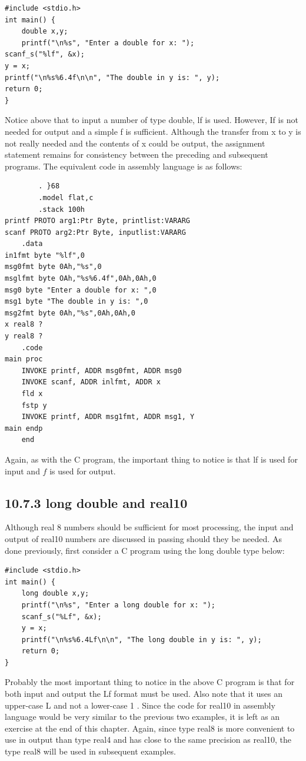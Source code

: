 \documentclass[10pt]{article}
\begin{document}
\begin{verbatim}
#include <stdio.h>
int main() {
    double x,y;
    printf("\n%s", "Enter a double for x: ");
scanf_s("%lf", &x);
y = x;
printf("\n%s%6.4f\n\n", "The double in y is: ", y);
return 0;
}
\end{verbatim}

Notice above that to input a number of type double, lf is used. However, If is not needed for output and a simple f is sufficient. Although the transfer from x to y is not really needed and the contents of x could be output, the assignment statement remains for consistency between the preceding and subsequent programs. The equivalent code in assembly language is as follows:

\begin{verbatim}
        . }68
        .model flat,c
        .stack 100h
printf PROTO arg1:Ptr Byte, printlist:VARARG
scanf PROTO arg2:Ptr Byte, inputlist:VARARG
    .data
in1fmt byte "%lf",0
msg0fmt byte 0Ah,"%s",0
msglfmt byte OAh,"%s%6.4f",0Ah,0Ah,0
msg0 byte "Enter a double for x: ",0
msg1 byte "The double in y is: ",0
msg2fmt byte 0Ah,"%s",0Ah,0Ah,0
x real8 ?
y real8 ?
    .code
main proc
    INVOKE printf, ADDR msg0fmt, ADDR msg0
    INVOKE scanf, ADDR inlfmt, ADDR x
    fld x
    fstp y
    INVOKE printf, ADDR msg1fmt, ADDR msg1, Y
main endp
    end
\end{verbatim}

Again, as with the C program, the important thing to notice is that lf is used for input and $f$ is used for output.

\subsection*{10.7.3 long double and real10}
Although real 8 numbers should be sufficient for most processing, the input and output of real10 numbers are discussed in passing should they be needed. As done previously, first consider a C program using the long double type below:

\begin{verbatim}
#include <stdio.h>
int main() {
    long double x,y;
    printf("\n%s", "Enter a long double for x: ");
    scanf_s("%Lf", &x);
    y = x;
    printf("\n%s%6.4Lf\n\n", "The long double in y is: ", y);
    return 0;
}
\end{verbatim}

Probably the most important thing to notice in the above C program is that for both input and output the Lf format must be used. Also note that it uses an upper-case L and not a lower-case 1 . Since the code for real10 in assembly language would be very similar to the previous two examples, it is left as an exercise at the end of this chapter. Again, since type real8 is more convenient to use in output than type real4 and has close to the same precision as real10, the type real8 will be used in subsequent examples.
\end{document}
